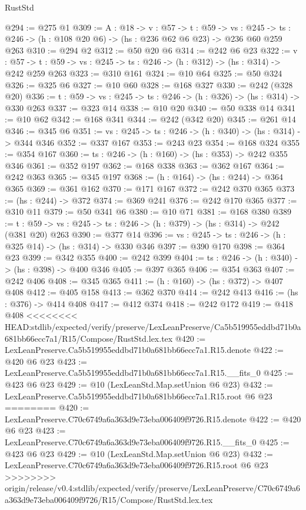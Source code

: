\begin{lexlean}{RustStd}
\begin{coremodule}
{\begin{coremodule}
@294 := @275 @1
@309 := {A : @18} ->
  {v : @57} ->
  {t : @59} ->
  {vs : @245} -> {ts : @246} -> (h : @108 @20 @6) -> (hs : @236 @62 @6 @23) -> @236 @60 @259 @263
@310 := @294 @2
@312 := @50 @20 @6
@314 := @242 @6 @23
@322 := {v : @57} ->
  {t : @59} -> {vs : @245} -> {ts : @246} -> (h : @312) -> (hs : @314) -> @242 @259 @263
@323 := @310 @161
@324 := @10 @64
@325 := @50 @324
@326 := @325 @6
@327 := @10 @60
@328 := @168 @327
@330 := @242 (@328 @20)
@336 := {t : @59} -> {vs : @245} -> {ts : @246} -> (h : @326) -> (hs : @314) -> @330 @263
@337 := @323 @14
@338 := @10 @20
@340 := @50 @338 @14
@341 := @10 @62
@342 := @168 @341
@344 := @242 (@342 @20)
@345 := @261 @14
@346 := @345 @6
@351 := {vs : @245} -> {ts : @246} -> (h : @340) -> (hs : @314) -> @344 @346
@352 := @337 @167
@353 := @243 @23
@354 := @168 @324
@355 := @354 @167
@360 := {ts : @246} -> (h : @160) -> (hs : @353) -> @242 @355 @346
@361 := @352 @197
@362 := @168 @338
@363 := @362 @167
@364 := @242 @363
@365 := @345 @197
@368 := (h : @164) -> (hs : @244) -> @364 @365
@369 := @361 @162
@370 := @171 @167
@372 := @242 @370 @365
@373 := (hs : @244) -> @372
@374 := @369 @241
@376 := @242 @170 @365
@377 := @310 @11
@379 := @50 @341 @6
@380 := @10 @71
@381 := @168 @380
@389 := {t : @59} -> {vs : @245} -> {ts : @246} -> (h : @379) -> (hs : @314) -> @242 (@381 @20) @263
@390 := @377 @14
@396 := {vs : @245} -> {ts : @246} -> (h : @325 @14) -> (hs : @314) -> @330 @346
@397 := @390 @170
@398 := @364 @23
@399 := @342 @355
@400 := @242 @399
@404 := {ts : @246} -> (h : @340) -> (hs : @398) -> @400 @346
@405 := @397 @365
@406 := @354 @363
@407 := @242 @406
@408 := @345 @365
@411 := (h : @160) -> (hs : @372) -> @407 @408
@412 := @405 @158
@413 := @362 @370
@414 := @242 @413
@416 := (hs : @376) -> @414 @408
@417 := @412 @374
@418 := @242 @172
@419 := @418 @408
<<<<<<<< HEAD:stdlib/expected/verify/preserve/LexLeanPreserve/Ca5b519955eddbd71b0a681bb66ecc7a1/R15/Compose/RustStd.lex.tex
@420 := LexLeanPreserve.Ca5b519955eddbd71b0a681bb66ecc7a1.R15.denote
@422 := @420 @6 @23
@423 := LexLeanPreserve.Ca5b519955eddbd71b0a681bb66ecc7a1.R15.__fits_0
@425 := @423 @6 @23
@429 := @10 (LexLeanStd.Map.setUnion @6 @23)
@432 := LexLeanPreserve.Ca5b519955eddbd71b0a681bb66ecc7a1.R15.root @6 @23
========
@420 := LexLeanPreserve.C70c6749a6a363d9e73eba006409f9726.R15.denote
@422 := @420 @6 @23
@423 := LexLeanPreserve.C70c6749a6a363d9e73eba006409f9726.R15.__fits_0
@425 := @423 @6 @23
@429 := @10 (LexLeanStd.Map.setUnion @6 @23)
@432 := LexLeanPreserve.C70c6749a6a363d9e73eba006409f9726.R15.root @6 @23
>>>>>>>> origin/release/v0.4:stdlib/expected/verify/preserve/LexLeanPreserve/C70c6749a6a363d9e73eba006409f9726/R15/Compose/RustStd.lex.tex

\end{coremodule}}
\end{coremodule}
\end{lexlean}
